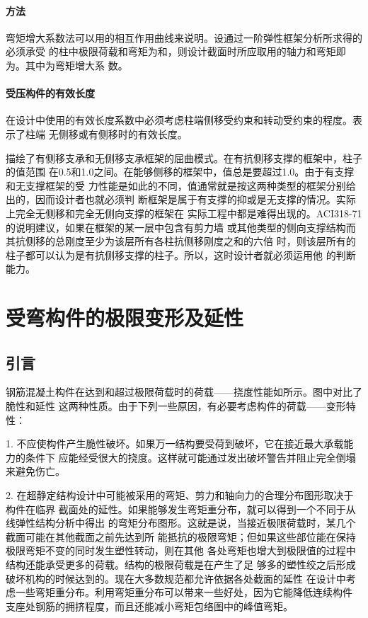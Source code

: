 \documentclass[12pt,a4paper]{book}
\begin{document}
\subsubsection{方法}

弯矩增大系数法可以用的相互作用曲线来说明。设通过一阶弹性框架分析所求得的必须承受
的柱中极限荷载和弯矩为和，则设计截面时所应取用的轴力和弯矩即为。其中为弯矩增大系
数。

\subsubsection{受压构件的有效长度}

在设计中使用的有效长度系数中必须考虑柱端侧移受约束和转动受约束的程度。表示了柱端
无侧移或有侧移时的有效长度。

描绘了有侧移支承和无侧移支承框架的屈曲模式。在有抗侧移支撑的框架中，柱子的值范围
在0.5和1.0之间。在能够侧移的框架中，值总是要超过1.0。由于有支撑和无支撑框架的受
力性能是如此的不同，值通常就是按这两种类型的框架分别给出的，因而设计者也就必须判
断框架是属于有支撑的抑或是无支撑的情况。实际上完全无侧移和完全无侧向支撑的框架在
实际工程中都是难得出现的。ACI318-71的说明建议，如果在框架的某一层中包含有剪力墙
或其他类型的侧向支撑结构而其抗侧移的总刚度至少为该层所有各柱抗侧移刚度之和的六倍
时，则该层所有的柱子都可以认为是有抗侧移支撑的柱子。所以，这时设计者就必须运用他
的判断能力。


\chapter{受弯构件的极限变形及延性}

\section{引言}

钢筋混凝土构件在达到和超过极限荷载时的荷载——挠度性能如所示。图中对比了脆性和延性
这两种性质。由于下列一些原因，有必要考虑构件的荷载——变形特性：

1. 不应使构件产生脆性破坏。如果万一结构要受荷到破坏，它在接近最大承载能力的条件下
应能经受很大的挠度。这样就可能通过发出破坏警告并阻止完全倒塌来避免伤亡。

2. 在超静定结构设计中可能被采用的弯矩、剪力和轴向力的合理分布图形取决于构件在临界
截面处的延性。如果能够发生弯矩重分布，就可以得到一个不同于从线弹性结构分析中得出
的弯矩分布图形。这就是说，当接近极限荷载时，某几个截面可能在其他截面之前先达到所
能抵抗的极限弯矩；但如果这些部位能在保持极限弯矩不变的同时发生塑性转动，则在其他
各处弯矩也增大到极限值的过程中结构还能承受更多的荷载。结构的极限荷载是在产生了足
够多的塑性绞之后形成破坏机构的时候达到的。现在大多数规范都允许依据各处截面的延性
在设计中考虑一些弯矩重分布。利用弯矩重分布可以带来一些好处，因为它能降低连续构件
支座处钢筋的拥挤程度，而且还能减小弯矩包络图中的峰值弯矩。
\end{document}
